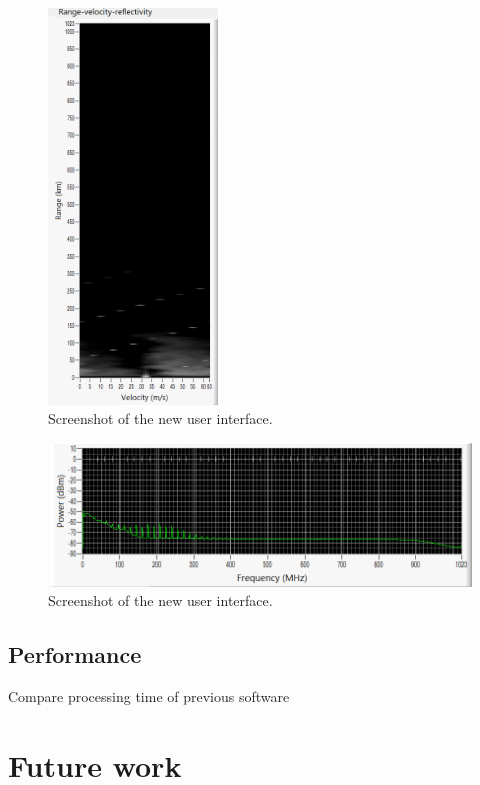 \documentclass{article}
\begin{document}
\begin{figure}
	\centering
	\includegraphics[width=0.4\textwidth]{working-heavy-rain-sleet_range-doppler}
	\caption{Screenshot of the new user interface.}
	\label{fig:WorkingHeavyRainSnowRangeDoppler}
\end{figure}

\begin{figure}
	\centering
	\includegraphics[width=\textwidth]{working-heavy-rain-sleet_power-spect}
	\caption{Screenshot of the new user interface.}
	\label{fig:WorkingHeavyRainSnowPowerSpectrum}
\end{figure}

\subsection{Performance}
Compare processing time of previous software

\section{Future work}
\end{document}
